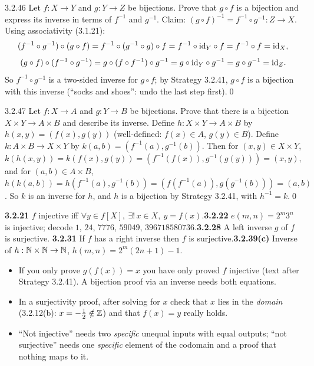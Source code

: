 \begin{bookex}[recommended]{3.2.46}
Let $f:X\to Y$ and $g:Y\to Z$ be bijections. Prove that $g\circ f$ is a bijection and express its inverse in terms of $f^{-1}$ and $g^{-1}$.
\solution
Claim: $(g\circ f)^{-1}=f^{-1}\circ g^{-1}:Z\to X$. Using associativity (3.1.21):
\[
(f^{-1}\circ g^{-1})\circ(g\circ f)=f^{-1}\circ(g^{-1}\circ g)\circ f=f^{-1}\circ\mathrm{id}_Y\circ f=f^{-1}\circ f=\mathrm{id}_X,
\]
\[
(g\circ f)\circ(f^{-1}\circ g^{-1})=g\circ(f\circ f^{-1})\circ g^{-1}=g\circ\mathrm{id}_Y\circ g^{-1}=g\circ g^{-1}=\mathrm{id}_Z .
\]
So $f^{-1}\circ g^{-1}$ is a two-sided inverse for $g\circ f$; by Strategy 3.2.41, $g\circ f$ is a bijection with this inverse (``socks and shoes'': undo the last step first).\qed
\end{bookex}

\begin{bookex}[essential]{3.2.47}
Let $f:X\to A$ and $g:Y\to B$ be bijections. Prove that there is a bijection $X\times Y\to A\times B$ and describe its inverse.
\solution
Define $h:X\times Y\to A\times B$ by $h(x,y)=(f(x),g(y))$ (well-defined: $f(x)\in A$, $g(y)\in B$). Define $k:A\times B\to X\times Y$ by $k(a,b)=(f^{-1}(a),g^{-1}(b))$. Then for $(x,y)\in X\times Y$,
\[
k(h(x,y))=k(f(x),g(y))=(f^{-1}(f(x)),g^{-1}(g(y)))=(x,y),
\]
and for $(a,b)\in A\times B$, $h(k(a,b))=h(f^{-1}(a),g^{-1}(b))=(f(f^{-1}(a)),g(g^{-1}(b)))=(a,b)$. So $k$ is an inverse for $h$, and $h$ is a bijection by Strategy 3.2.41, with $h^{-1}=k$.\qed
\end{bookex}

\begin{trybox}[{3.2.21, 3.2.22, 3.2.28, 3.2.31, 3.2.39(c) \fO}]
\textbf{3.2.21} $f$ injective iff $\forall y\in f[X],\ \exists!\,x\in X,\ y=f(x)$.\quad \textbf{3.2.22} $e(m,n)=2^m3^n$ is injective; decode $1$, $24$, $7776$, $59049$, $396718580736$.\quad \textbf{3.2.28} A left inverse $g$ of $f$ is surjective. \quad \textbf{3.2.31} If $f$ has a right inverse then $f$ is surjective.\quad \textbf{3.2.39(c)} Inverse of $h:\mathbb{N}\times\mathbb{N}\to\mathbb{N}$, $h(m,n)=2^m(2n+1)-1$. 
\end{trybox}

\begin{warn}
\begin{itemize}
\item If you only prove $g(f(x))=x$ you have only proved $f$ injective (text after Strategy 3.2.41). A bijection proof via an inverse needs both equations.
\item In a surjectivity proof, after solving for $x$ check that $x$ lies in the \emph{domain} (3.2.12(b): $x=-\frac12\notin\mathbb{Z}$) and that $f(x)=y$ really holds.
\item ``Not injective'' needs two \emph{specific} unequal inputs with equal outputs; ``not surjective'' needs one \emph{specific} element of the codomain and a proof that nothing maps to it.
\end{itemize}
\end{warn}


